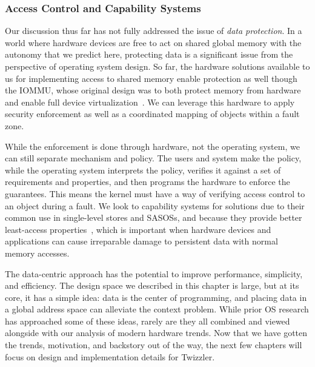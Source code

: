 \subsubsection{Access Control and Capability Systems}
Our discussion thus far has not fully addressed the issue of \emph{data protection}. In a world
where hardware devices are free to act on shared global memory with the autonomy that we predict
here, protecting data is a significant issue from the perspective of operating system design. So far, the hardware
solutions available to us for implementing access to shared memory enable
protection as well though the IOMMU, whose original design was to both protect memory from hardware
and enable full device virtualization~\cite{markuze2016true}. We can leverage this hardware to apply
security enforcement as well as a coordinated mapping of objects within a fault zone.

While the enforcement is done through hardware, not the operating system, we can still separate mechanism and policy. The users
and system make the policy, while the operating system interprets the policy, verifies it against a
set of requirements and properties, and then programs the hardware to enforce the guarantees. This
means the kernel must have a way of verifying access control to an object during a fault. We look to
capability systems for solutions due to their common use in single-level stores and SASOSs, and
because they provide better least-access properties~\cite{capmyth}, which is important when hardware devices and
applications can cause irreparable damage to persistent data with normal memory accesses.


\begin{chconc}
    The data-centric approach has the potential to improve performance, simplicity, and efficiency. The design space we
    described in this chapter is large, but at its core, it has a simple idea: data is the center of programming, and
    placing data in a global address space can alleviate the context problem. While prior OS research has approached
    some of these ideas, rarely are they all combined and viewed alongside with our analysis of modern hardware trends.
    Now that we have gotten the trends, motivation, and backstory out of the way, the next few chapters will focus on
    design and implementation details for Twizzler.
\end{chconc}